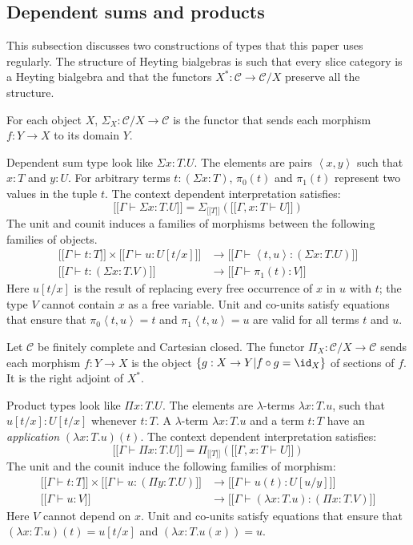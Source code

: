 \documentclass{tac}
\newcommand\cat\mathcal
\newcommand\set[1]{\left\{#1\right\}}
\newcommand\ri{^*}
\newcommand\of{:}
\newcommand\db[1]{{[\![}#1{]\!]}}
\newcommand\dsum{\Sigma_}
\newcommand\dprod{\Pi_}
\newcommand\tuple[1]{\left\langle #1 \right\rangle}
\begin{document}
\subsection{Dependent sums and products}
This subsection discusses two constructions of types that this paper uses regularly. The structure of Heyting bialgebras is such that every slice category is a Heyting bialgebra and that the functors $X\ri\of\cat C\to\cat C/X$ preserve all the structure.


For each object $X$, $\dsum X\of\cat C/X\to \cat C$ is the functor that sends each morphism $f\of Y\to X$ to its domain $Y$.

Dependent sum type look like $\Sigma x\of T.U$. The elements are pairs $\tuple{x,y}$ such that $x\of T$ and $y\of U$. For arbitrary terms $t\of(\Sigma x\of T)$, $\pi_0(t)$ and $\pi_1(t)$ represent two values in the tuple $t$. The context dependent interpretation satisfies:
\[ \db{\Gamma\vdash\Sigma x\of T.U} = \dsum {\db T}(\db{\Gamma,x\of T\vdash U}) \]
The unit and counit induces a families of morphisms between the following families of objects.
\begin{align*}
\db{\Gamma\vdash t\of T}\times\db{\Gamma\vdash u\of U[t/x]} &\to \db{\Gamma\vdash \tuple{t, u}\of(\Sigma x\of T.U)}\\
\db{\Gamma\vdash t\of (\Sigma x\of T.V)}&\to \db{\Gamma\vdash \pi_1(t) \of V}
\end{align*}
Here $u[t/x]$ is the result of replacing every free occurrence of $x$ in $u$ with $t$; the type $V$ cannot contain $x$ as a free variable. Unit and co-units satisfy equations that ensure that $\pi_0\tuple{t,u}=t$ and $\pi_1\tuple{t,u}=u$ are valid for all terms $t$ and $u$.


Let $\cat C$ be finitely complete and Cartesian closed. The functor $\dprod X\of\cat C/X\to \cat C$ sends each morphism $f\of Y\to X$ is the object $\set{g\of X\to Y| f\circ g = \id_X }$ of sections of $f$. It is the right adjoint of $X\ri$.

Product types look like $\Pi x\of T.U$. The elements are $\lambda$-terms $\lambda x\of T.u$, such that $u[t/x]\of U[t/x]$ whenever $t\of T$. A $\lambda$-term $\lambda x\of T.u$ and a term $t\of T$ have an \emph{application} $(\lambda x\of T.u)(t)$. The context dependent interpretation satisfies:
\[ \db{\Gamma\vdash\Pi x\of T.U} = \dprod {\db T}(\db{\Gamma,x\of T\vdash U}) \]
The unit and the counit induce the following families of morphism:
\begin{align*}
\db{\Gamma\vdash t\of T}\times\db{\Gamma\vdash u\of(\Pi y\of T.U)}&\to\db{\Gamma\vdash u(t)\of U[u/y]}\\
\db{\Gamma\vdash u\of V}&\to\db{\Gamma\vdash (\lambda x\of T.u)\of(\Pi x\of T.V)}
\end{align*}
Here $V$ cannot depend on $x$. Unit and co-units satisfy equations that ensure that $(\lambda x\of T.u)(t) = u[t/x]$ and $(\lambda x\of T.u(x))=u$.
\end{document}
